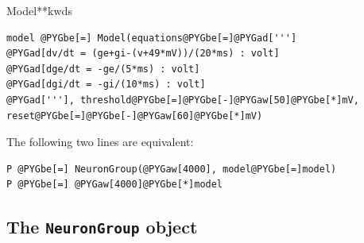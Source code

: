 \documentclass[letterpaper,10pt]{manual}
\begin{document}
\begin{classdesc}{Model}{**kwds}
\begin{Verbatim}[commandchars=@\[\]]
model @PYGbe[=] Model(equations@PYGbe[=]@PYGad[''']
@PYGad[dv/dt = (ge+gi-(v+49*mV))/(20*ms) : volt]
@PYGad[dge/dt = -ge/(5*ms) : volt]
@PYGad[dgi/dt = -gi/(10*ms) : volt]
@PYGad['''], threshold@PYGbe[=]@PYGbe[-]@PYGaw[50]@PYGbe[*]mV, reset@PYGbe[=]@PYGbe[-]@PYGaw[60]@PYGbe[*]mV)
\end{Verbatim}

The following two lines are equivalent:

\begin{Verbatim}[commandchars=@\[\]]
P @PYGbe[=] NeuronGroup(@PYGaw[4000], model@PYGbe[=]model)
P @PYGbe[=] @PYGaw[4000]@PYGbe[*]model
\end{Verbatim}
\end{classdesc}


\subsection{The \texttt{NeuronGroup} object}
\end{document}
